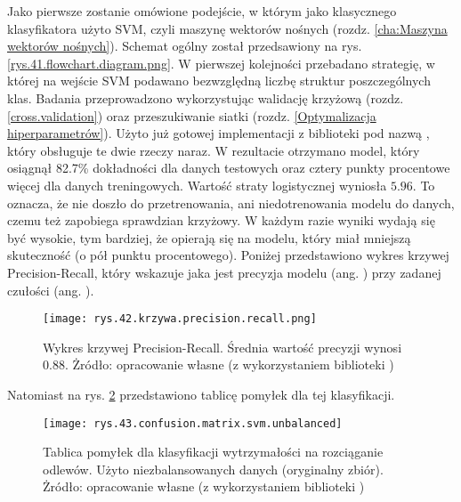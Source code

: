 Jako pierwsze zostanie omówione podejście, w którym jako klasycznego klasyfikatora użyto SVM, czyli maszynę wektorów nośnych (rozdz. \ref{cha:Maszyna wektorów nośnych}). Schemat ogólny został przedsawiony na rys. \ref{rys.41.flowchart.diagram.png}. W pierwszej kolejności przebadano strategię, w której na wejście SVM podawano bezwzględną liczbę struktur poszczególnych klas. Badania przeprowadzono wykorzystując walidację krzyżową (rozdz. \ref{cross.validation}) oraz przeszukiwanie siatki (rozdz. \ref{Optymalizacja hiperparametrów}). Użyto już gotowej implementacji z biblioteki  pod nazwą , który obsługuje te dwie rzeczy naraz. W rezultacie otrzymano model, który osiągnął 82.7\% dokładności dla danych testowych oraz cztery punkty procentowe więcej dla danych treningowych. Wartość straty logistycznej wyniosła $5.96$. To oznacza, że nie doszło do przetrenowania, ani niedotrenowania modelu do danych, czemu też zapobiega sprawdzian krzyżowy. W każdym razie wyniki wydają się być wysokie, tym bardziej, że opierają się na modelu, który miał mniejszą skuteczność (o pół punktu procentowego). Poniżej przedstawiono wykres krzywej Precision-Recall, który wskazuje jaka jest precyzja modelu (ang. ) przy zadanej czułości (ang. ). 
\begin{figure}[h]
    \centering
    \texttt{[image: rys.42.krzywa.precision.recall.png]}
    \caption{Wykres krzywej Precision-Recall. Średnia wartość precyzji wynosi 0.88. Żródło: opracowanie własne (z wykorzystaniem biblioteki )}
    \label{rys.42.krzywa.precision.recall.png}
\end{figure}
Natomiast na rys. \ref{rys.43.confusion.matrix.svm.unbalanced} przedstawiono tablicę pomyłek dla tej klasyfikacji.
\begin{figure}[h]
    \centering
    \texttt{[image: rys.43.confusion.matrix.svm.unbalanced]}
    \caption{Tablica pomyłek dla klasyfikacji wytrzymałości na rozciąganie odlewów. Użyto niezbalansowanych danych (oryginalny zbiór). Żródło: opracowanie własne (z wykorzystaniem biblioteki )}
    \label{rys.43.confusion.matrix.svm.unbalanced}
\end{figure}

